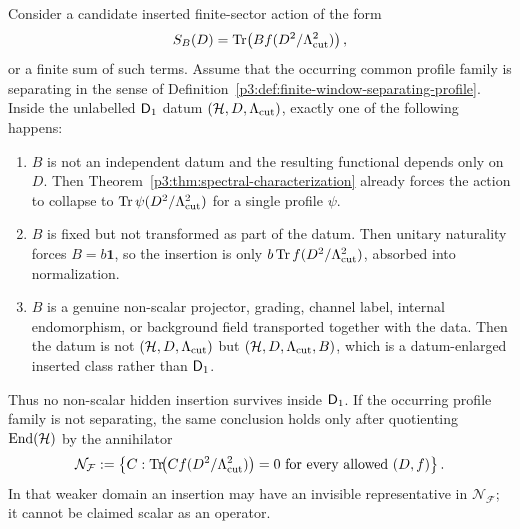 \documentclass[12pt,a4paper]{article}
\begin{document}
\begin{lemma}
\label{p3:lem:insertions-scalar}
Consider a candidate inserted finite-sector action of the form
\[
        S_B(D)=\operatorname{Tr}\!\left(B f(D^2/\Lambda_{\mathrm{cut}}^2)\right),
\]
or a finite sum of such terms.  Assume that the occurring common profile
family is separating in the sense of
Definition~\ref{p3:def:finite-window-separating-profile}.  Inside the
unlabelled \(\mathsf{D}_1\) datum \((\mathcal H,D,\Lambda_{\mathrm{cut}})\), exactly one of the
following happens:
\begin{enumerate}[label=(\roman*),leftmargin=2.1em]
\item \(B\) is not an independent datum and the resulting functional depends only on
\(D\).  Then Theorem~\ref{p3:thm:spectral-characterization} already forces the action to
collapse to \(\operatorname{Tr}\psi(D^2/\Lambda_{\mathrm{cut}}^2)\) for a single profile \(\psi\).
\item \(B\) is fixed but not transformed as part of the datum.  Then unitary naturality
forces \(B=b\mathbf 1\), so the insertion is only
\(b\operatorname{Tr} f(D^2/\Lambda_{\mathrm{cut}}^2)\), absorbed into normalization.
\item \(B\) is a genuine non-scalar projector, grading, channel label, internal
endomorphism, or background field transported together with the data.  Then the datum is
not \((\mathcal H,D,\Lambda_{\mathrm{cut}})\) but \((\mathcal H,D,\Lambda_{\mathrm{cut}},B)\), which is a datum-enlarged inserted
class rather than \(\mathsf{D}_1\).
\end{enumerate}
Thus no non-scalar hidden insertion survives inside \(\mathsf{D}_1\).
If the occurring profile family is not separating, the same conclusion holds
only after quotienting \(\operatorname{End}(\mathcal H)\) by the annihilator
\[
 \mathcal N_{\mathcal F}
 :=\left\{C:
 \operatorname{Tr}\!\bigl(Cf(D^2/\Lambda_{\mathrm{cut}}^2)\bigr)=0
 \text{ for every allowed }(D,f)\right\}.
\]
In that weaker domain an insertion may have an invisible representative in
\(\mathcal N_{\mathcal F}\); it cannot be claimed scalar as an operator.
\end{lemma}
\end{document}
